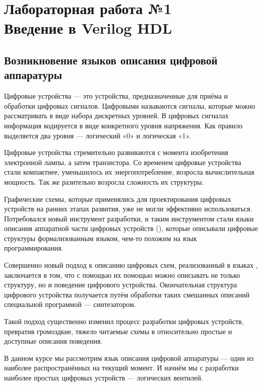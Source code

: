\chapter{Лабораторная работа №1\\Введение в Verilog HDL} 
\section{Возникновение языков описания цифровой аппаратуры}

\par{Цифровые устройства — это устройства, предназначенные для приёма и обработки цифровых сигналов. Цифровыми называются сигналы, которые можно рассматривать в виде набора дискретных уровней. В цифровых сигналах информация кодируется в виде конкретного уровня напряжения. Как правило выделяется два уровня — логический «0» и логическая «1».}

\par{Цифровые устройства стремительно развиваются с момента изобретения электронной лампы, а затем транзистора. Со временем цифровые устройства стали компактнее, уменьшилось их энергопотребление, возросла вычислительная мощность. Так же разительно возросла сложность их структуры.}

\par{Графические схемы, которые применялись для проектирования цифровых устройств на ранних этапах развития, уже не могли эффективно использоваться. Потребовался новый инструмент разработки, и таким инструментом стали языки описания аппаратной части цифровых устройств (), которые описывали цифровые структуры формализованным языком, чем-то похожим на язык программирования.}

\par{Совершенно новый подход к описанию цифровых схем, реализованный в языках , заключается в том, что с помощью их помощью можно описывать не только структуру, но и поведение цифрового устройства. Окончательная структура цифрового устройства получается путём обработки таких смешанных описаний специальной программой — синтезатором.}

\par{Такой подход существенно изменил процесс разработки цифровых устройств, превратив громоздкие, тяжело читаемые схемы в относительно простые и доступные описания поведения.}

\par{В данном курсе мы рассмотрим язык описания цифровой аппаратуры  — один из наиболее распространённых на текущий момент. И начнём мы с разработки наиболее простых цифровых устройств — логических вентилей.}

